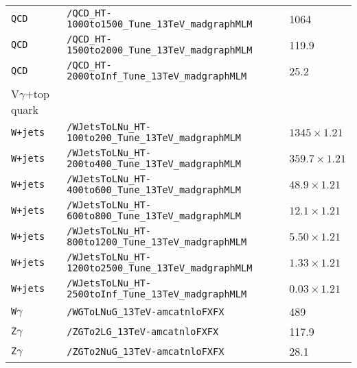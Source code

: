 \begin{table}[ht!]
\begin{center}
\begin{tabular}{|l l l|}
        \scriptsize{\texttt{QCD}}             & \scriptsize{\texttt{/QCD\_HT-1000to1500\_Tune\_13TeV\_madgraphMLM}}         &  \scriptsize{1064}       \\
        \scriptsize{\texttt{QCD}}             & \scriptsize{\texttt{/QCD\_HT-1500to2000\_Tune\_13TeV\_madgraphMLM}}         &  \scriptsize{119.9}       \\
        \scriptsize{\texttt{QCD}}             & \scriptsize{\texttt{/QCD\_HT-2000toInf\_Tune\_13TeV\_madgraphMLM}}          &  \scriptsize{25.2}       \\
        V$\gamma$+top quark     &    &            \\
        \scriptsize{\texttt{W+jets}}          & \scriptsize{\texttt{/WJetsToLNu\_HT-100to200\_Tune\_13TeV\_madgraphMLM}}    &  \scriptsize{$1345\times1.21$}       \\
        \scriptsize{\texttt{W+jets}}          & \scriptsize{\texttt{/WJetsToLNu\_HT-200to400\_Tune\_13TeV\_madgraphMLM}}    &  \scriptsize{$359.7\times1.21$}       \\
        \scriptsize{\texttt{W+jets}}          & \scriptsize{\texttt{/WJetsToLNu\_HT-400to600\_Tune\_13TeV\_madgraphMLM}}    &  \scriptsize{$48.9\times1.21$}       \\
        \scriptsize{\texttt{W+jets}}          & \scriptsize{\texttt{/WJetsToLNu\_HT-600to800\_Tune\_13TeV\_madgraphMLM}}    &  \scriptsize{$12.1\times1.21$}       \\
        \scriptsize{\texttt{W+jets}}          & \scriptsize{\texttt{/WJetsToLNu\_HT-800to1200\_Tune\_13TeV\_madgraphMLM}}   &  \scriptsize{$5.50\times1.21$}       \\
        \scriptsize{\texttt{W+jets}}          & \scriptsize{\texttt{/WJetsToLNu\_HT-1200to2500\_Tune\_13TeV\_madgraphMLM}}  &  \scriptsize{$1.33\times1.21$}       \\
        \scriptsize{\texttt{W+jets}}          & \scriptsize{\texttt{/WJetsToLNu\_HT-2500toInf\_Tune\_13TeV\_madgraphMLM}}   &  \scriptsize{$0.03\times1.21$}       \\
        \scriptsize{\texttt{W$\gamma$}}         & \scriptsize{\texttt{/WGToLNuG\_13TeV-amcatnloFXFX }}                        &  \scriptsize{489}       \\
        \scriptsize{\texttt{Z$\gamma$}}         & \scriptsize{\texttt{/ZGTo2LG\_13TeV-amcatnloFXFX }}                         &  \scriptsize{117.9}       \\
        \scriptsize{\texttt{Z$\gamma$}}         & \scriptsize{\texttt{/ZGTo2NuG\_13TeV-amcatnloFXFX }}                        &  \scriptsize{28.1}       \\

\end{tabular}
\end{center}
\end{table}
